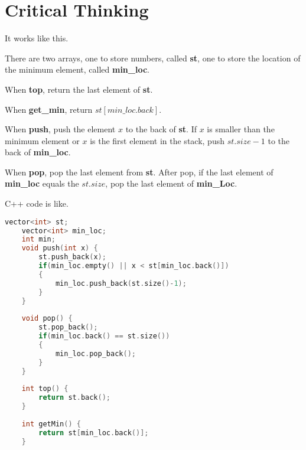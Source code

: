 \documentclass[12pt,a4paper]{article}
\theoremstyle{definition}
\begin{document}
\section{Critical Thinking}
\par It works like this.
\par There are two arrays, one to store numbers, called \textbf{st}, one to store the location of the minimum element, called \textbf{min\_loc}.
\par When \textbf{top}, return the last element of \textbf{st}.
\par When \textbf{get\_min}, return $st[min\_loc.back]$.
\par When \textbf{push}, push the element $x$ to the back of \textbf{st}. If $x$ is smaller than the minimum element or $x$ is the first element in the stack, push $st.size-1$ to the back of \textbf{min\_loc}.
\par When \textbf{pop}, pop the last element from \textbf{st}. After pop, if the last element of \textbf{min\_loc} equals the $st.size$, pop the last element of \textbf{min\_Loc}. 
\par C++ code is like.
\begin{lstlisting}[language=c++]
    vector<int> st;
    vector<int> min_loc;
    int min;
    void push(int x) {
        st.push_back(x);
        if(min_loc.empty() || x < st[min_loc.back()])
        {
            min_loc.push_back(st.size()-1);
        }
    }
    
    void pop() {
        st.pop_back();
        if(min_loc.back() == st.size())
        {
            min_loc.pop_back();
        }
    }
    
    int top() {
        return st.back();
    }
    
    int getMin() {
        return st[min_loc.back()];
    }
\end{lstlisting}
\end{document}
